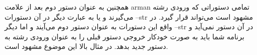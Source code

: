 \documentclass[]{article}
\begin{document}
همچنین به عنوان دستور دوم بعد از علامت arman تمامی دستوراتی که ورودی رشته می‌گیرند و یا به عبارت دیگر در آن دستورات --str مشهود است می‌تواند قرار گیرد. در واقع این دستورات به عنوان دستور دوم می‌آیند و اما دیگر --str در آن دستور نمی‌آید و برنامه شما باید به صورت خودکار خروجی دستور قبلی را به عنوان ورودی رشته به دستور جدید بدهد. در مثال بالا این موضوع مشهود است.






































\end{document}
